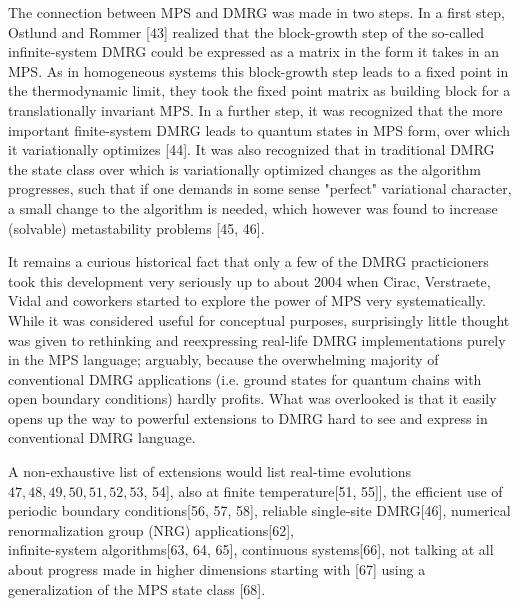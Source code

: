 \documentclass[12pt]{article}
\begin{document}
The connection between MPS and DMRG was made in two steps. In a first step, Ostlund and Rommer [43] realized that the block-growth step of the so-called infinite-system DMRG could be expressed as a matrix in the form it takes in an MPS. As in homogeneous systems this block-growth step leads to a fixed point in the thermodynamic limit, they took the fixed point matrix as building block for a translationally invariant MPS. In a further step, it was recognized that the more important finite-system DMRG leads to quantum states in MPS form, over which it variationally optimizes [44]. It was also recognized that in traditional DMRG the state class over which is variationally optimized changes as the algorithm progresses, such that if one demands in some sense "perfect" variational character, a small change to the algorithm is needed, which however was found to increase (solvable) metastability problems [45, 46].

It remains a curious historical fact that only a few of the DMRG practicioners took this development very seriously up to about 2004 when Cirac, Verstraete, Vidal and coworkers started to explore the power of MPS very systematically. While it was considered useful for conceptual purposes, surprisingly little thought was given to rethinking and reexpressing real-life DMRG implementations purely in the MPS language; arguably, because the overwhelming majority of conventional DMRG applications (i.e. ground states for quantum chains with open boundary conditions) hardly profits. What was overlooked is that it easily opens up the way to powerful extensions to DMRG hard to see and express in conventional DMRG language.

A non-exhaustive list of extensions would list real-time evolutions $47,48,49,50,51,52,53$, 54], also at finite temperature[51, 55]], the efficient use of periodic boundary conditions[56, 57, 58], reliable single-site DMRG[46], numerical renormalization group (NRG) applications[62],\\
infinite-system algorithms[63, 64, 65], continuous systems[66], not talking at all about progress made in higher dimensions starting with [67] using a generalization of the MPS state class [68].
\end{document}
